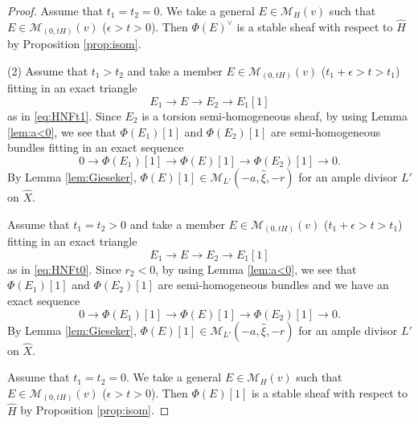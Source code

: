 \documentclass[10pt,a4paper]{amsart}
\newcommand{\cal}{\mathcal}
\begin{document}
\begin{proof}
Assume that $t_1=t_2=0$.
We take a general $E \in {\cal M}_H(v)$ such that  
$E \in  {\cal M}_{(0,tH)}(v)$ ($\epsilon> t>0$).
Then  $\Phi(E)^{\vee}$ is a stable sheaf with respect to $\widehat{H}$
by Proposition \ref{prop:isom}.

(2)
Assume that $t_1>t_2$ and take a member $E \in {\cal M}_{(0,tH)}(v)$ ($t_1+\epsilon> t>t_1$)
fitting in an exact triangle
$$
E_1 \to E \to E_2 \to E_1[1]
$$
as in \eqref{eq:HNFt1}.
Since $E_2$ is a torsion semi-homogeneous sheaf,
by using Lemma \ref{lem:a<0},
we see that $\Phi(E_1)[1]$ and $\Phi(E_2)[1]$
are semi-homogeneous bundles
fitting in an exact sequence
$$
0 \to \Phi(E_1)[1] \to \Phi(E)[1] \to \Phi(E_2)[1] \to 0.
$$
By Lemma \ref{lem:Gieseker}, 
$\Phi(E)[1] \in {\cal M}_{L'}(-a,\widehat{\xi},-r)$ for an ample divisor $L'$
on $\widehat{X}$.

Assume that $t_1=t_2>0$
and take a member $E \in {\cal M}_{(0,tH)}(v)$ ($t_1+\epsilon> t>t_1$)
fitting in an exact triangle
$$
E_1 \to E \to E_2 \to E_1[1]
$$
as in \eqref{eq:HNFt0}.
Since $r_2<0$, by using Lemma \ref{lem:a<0},
we see that $\Phi(E_1)[1] $ and $\Phi(E_2)[1]$
are semi-homogeneous bundles
and we have an exact sequence
$$
0 \to \Phi(E_1)[1] \to \Phi(E)[1] \to \Phi(E_2)[1] \to 0.
$$
By Lemma \ref{lem:Gieseker}, 
$\Phi(E)[1] \in {\cal M}_{L'}(-a,\widehat{\xi},-r)$ for an ample divisor $L'$
on $\widehat{X}$.

Assume that $t_1=t_2=0$. We take a general $E \in {\cal M}_H(v)$ such that  
$E \in  {\cal M}_{(0,tH)}(v)$ ($\epsilon> t>0$).
Then  $\Phi(E)[1]$ is a stable sheaf with respect to $\widehat{H}$
by Proposition \ref{prop:isom}.
\end{proof}
\end{document}
